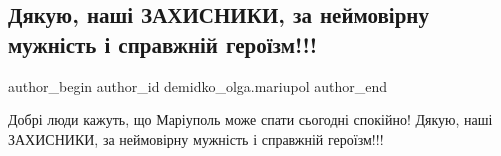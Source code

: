  
 
 
 
 

\subsection{Дякую,  наші ЗАХИСНИКИ, за неймовірну мужність і справжній  героїзм!!!}
\label{sec:26_02_2022.fb.demidko_olga.mariupol.1.djakuju_zahysnyky}

\ifcmt
 author_begin
   author_id demidko_olga.mariupol
 author_end
\fi

Добрі люди кажуть, що Маріуполь може спати сьогодні спокійно! Дякую,  наші
ЗАХИСНИКИ, за неймовірну мужність і справжній  героїзм!!!💙💛
